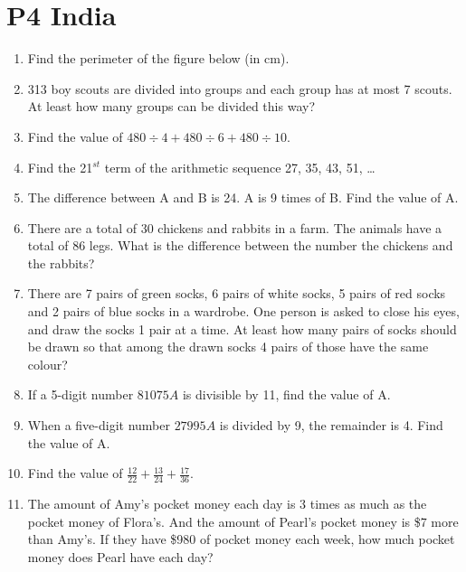 \documentclass[11pt]{scrartcl}
\begin{document}
\section{P4 India}
\begin{enumerate}
    \item Find the perimeter of the figure below (in cm).
    
    \item 313 boy scouts are divided into groups and each group has at most 7 scouts. At least how many groups can be divided this way?
    
    \item Find the value of $480 \div 4 + 480 \div 6 + 480 \div 10$.
    
    \item Find the 21$^{st}$ term of the arithmetic sequence 27, 35, 43, 51, \ldots
    
    \item The difference between A and B is 24. A is 9 times of B. Find the value of A.
    
    \item There are a total of 30 chickens and rabbits in a farm. The animals have a total of 86 legs. What is the difference between the number the chickens and the rabbits?
    
    \item There are 7 pairs of green socks, 6 pairs of white socks, 5 pairs of red socks and 2 pairs of blue socks in a wardrobe. One person is asked to close his eyes, and draw the socks 1 pair at a time. At least how many pairs of socks should be drawn so that among the drawn socks 4 pairs of those have the same colour?
    
    \item If a 5-digit number $81075A$ is divisible by 11, find the value of A.
    
    \item When a five-digit number $27995A$ is divided by 9, the remainder is 4. Find the value of A.
    
    \item Find the value of $\frac{12}{22} + \frac{13}{24} + \frac{17}{36}$.
    
    \item The amount of Amy's pocket money each day is 3 times as much as the pocket money of Flora's. And the amount of Pearl's pocket money is \$7 more than Amy's. If they have \$980 of pocket money each week, how much pocket money does Pearl have each day?
    

\end{enumerate}
\end{document}
